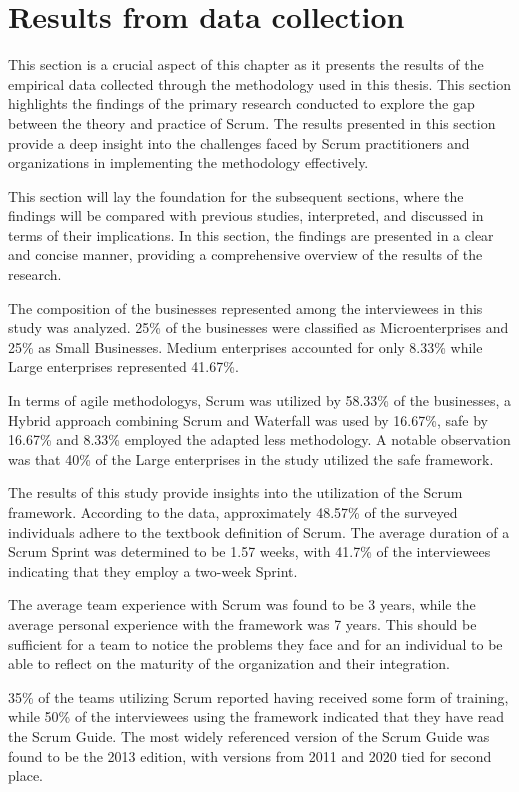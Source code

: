\section{Results from data collection}\label{sec:Findingsfromdatacollection}
This section is a crucial aspect of this chapter as it presents the results of the empirical data collected through the \gls{methodology} used in this thesis. This section highlights the findings of the primary research conducted to explore the gap between the theory and practice of Scrum. The results presented in this section provide a deep insight into the challenges faced by Scrum practitioners and organizations in implementing the \gls{methodology} effectively.

This section will lay the foundation for the subsequent sections, where the findings will be compared with previous studies, interpreted, and discussed in terms of their implications. In this section, the findings are presented in a clear and concise manner, providing a comprehensive overview of the results of the research.

The composition of the businesses represented among the interviewees in this study was analyzed. 25\% of the businesses were classified as Microenterprises and 25\% as Small Businesses. Medium enterprises accounted for only 8.33\% while Large enterprises represented 41.67\%. 

In terms of \gls{agile} \glspl{methodology}, Scrum was utilized by 58.33\% of the businesses, a Hybrid approach combining Scrum and Waterfall was used by 16.67\%, \ac{safe} by 16.67\% and 8.33\% employed the adapted \ac{less} \gls{methodology}. A notable observation was that 40\% of the Large enterprises in the study utilized the \ac{safe} \gls{framework}.

The results of this study provide insights into the utilization of the Scrum \gls{framework}. According to the data, approximately 48.57\% of the surveyed individuals adhere to the textbook definition of Scrum. The average duration of a Scrum Sprint was determined to be 1.57 weeks, with 41.7\% of the interviewees indicating that they employ a two-week Sprint. 

The average team experience with Scrum was found to be 3 years, while the average personal experience with the \gls{framework} was 7 years. This should be sufficient for a team to notice the problems they face and for an individual to be able to reflect on the maturity of the organization and their integration.

35\% of the teams utilizing Scrum reported having received some form of training, while 50\% of the interviewees using the \gls{framework} indicated that they have read the Scrum Guide. The most widely referenced version of the Scrum Guide was found to be the 2013 edition, with versions from 2011 and 2020 tied for second place. 

